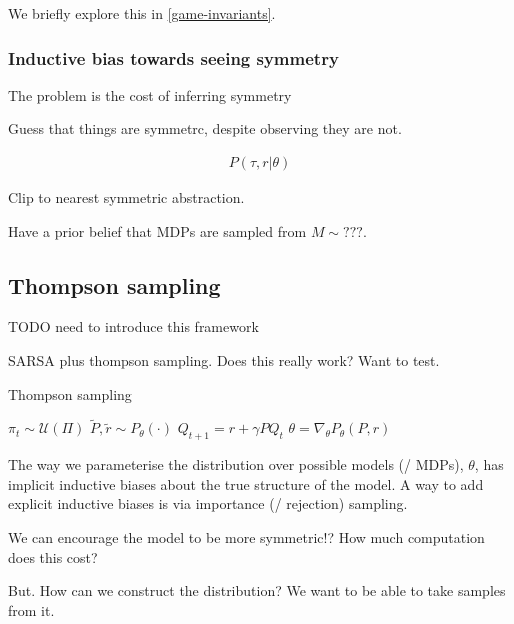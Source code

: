 We briefly explore this in \ref{game-invariants}.


\subsubsection{Inductive bias towards seeing symmetry}


The problem is the cost of inferring symmetry

Guess that things are symmetrc, despite observing they are not.

\begin{align}
P(\tau, r| \theta)
\end{align}

Clip to nearest symmetric abstraction.

Have a prior belief that MDPs are sampled from $M \sim ???$.


\subsection{Thompson sampling} \label{thompson-sampling}

{\color{red}TODO need to introduce this framework}

SARSA plus thompson sampling. Does this really work? Want to test.

\begin{algorithm}
	\caption{Thompson sampling}
	\begin{algorithmic}[1]

		\State $\pi_t \sim \mathcal U(\Pi)$
		\State $\tilde P, \tilde r \sim P_{\theta}(\cdot)$
		\State $Q_{t+1} =  r + \gamma P Q_t$ 
		\State $\theta = \nabla_{\theta} P_{\theta}(P, r)$ 

		\EndWhile
		\State \algorithmicreturn{ $\pi$}
		\EndProcedure

	\end{algorithmic}
\end{algorithm}

The way we parameterise the distribution over possible models (/ MDPs), $\theta$, has implicit inductive biases about the true structure of the model.
A way to add explicit inductive biases is via importance (/ rejection) sampling.

We can encourage the model to be more symmetric!?
How much computation does this cost?

But. How can we construct the distribution? We want to be able to take samples
from it.

